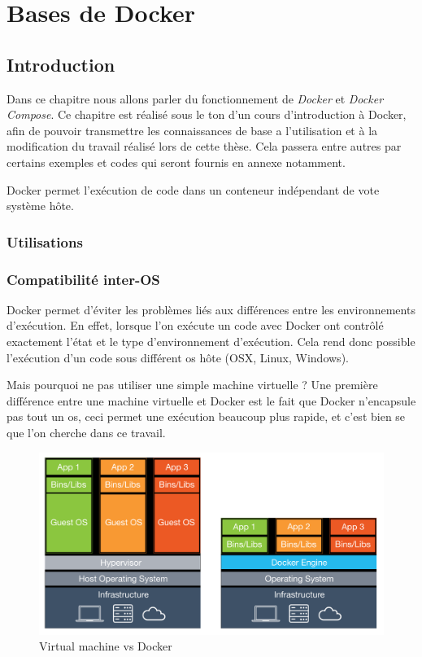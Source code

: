 \chapter{Bases de Docker}
\label{ch:docker}

\section{Introduction}
Dans ce chapitre nous allons parler du fonctionnement de \emph{Docker} et \emph{Docker Compose}. Ce chapitre est réalisé sous le ton d'un cours d'introduction à Docker, afin de pouvoir transmettre les connaissances de base a l'utilisation et à la modification du travail réalisé lors de cette thèse. Cela passera entre autres par certains exemples et codes qui seront fournis en annexe notamment.

Docker permet l'exécution de code dans un conteneur indépendant de vote système hôte. 

\subsection{Utilisations}
\subsection{Compatibilité inter-OS}
Docker permet d'éviter les problèmes liés aux différences entre les environnements d'exécution. En effet, lorsque l'on exécute un code avec Docker ont contrôlé exactement l'état et le type d'environnement d'exécution. Cela rend donc possible l'exécution d'un code sous différent \gls{os} hôte (OSX, Linux, Windows).

Mais pourquoi ne pas utiliser une simple machine virtuelle ? Une première différence entre une machine virtuelle et Docker est le fait que Docker n'encapsule pas tout un \gls{os}, ceci permet une exécution beaucoup plus rapide, et c'est bien se que l'on cherche dans ce travail.

\begin{figure}[H] 
\centering 
\includegraphics[width=1\columnwidth]{img/vm-vs-docker-container} 
\caption[vm vs Docker]{Virtual machine vs Docker}
\label{fig:vs} 
\end{figure}


